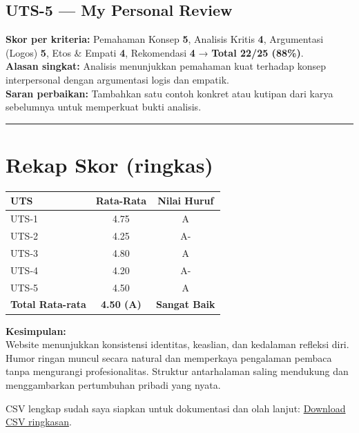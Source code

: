 \documentclass[
  letterpaper,
  DIV=11,
  numbers=noendperiod]{scrreprt}
\begin{document}
\subsection{\texorpdfstring{\textbf{UTS-5 --- My Personal
Review}}{UTS-5 --- My Personal Review}}\label{uts-5-my-personal-review}

\textbf{Skor per kriteria:} Pemahaman Konsep \textbf{5}, Analisis Kritis
\textbf{4}, Argumentasi (Logos) \textbf{5}, Etos \& Empati \textbf{4},
Rekomendasi \textbf{4} → \textbf{Total 22/25 (88\%)}.\\
\textbf{Alasan singkat:} Analisis menunjukkan pemahaman kuat terhadap
konsep interpersonal dengan argumentasi logis dan empatik.\\
\textbf{Saran perbaikan:} Tambahkan satu contoh konkret atau kutipan
dari karya sebelumnya untuk memperkuat bukti analisis.

\begin{center}\rule{0.5\linewidth}{0.5pt}\end{center}

\section{Rekap Skor (ringkas)}\label{rekap-skor-ringkas}

\begin{longtable}[]{@{}lcc@{}}
\toprule\noalign{}
UTS & Rata-Rata & Nilai Huruf \\
\midrule\noalign{}
\endhead
\bottomrule\noalign{}
\endlastfoot
UTS-1 & 4.75 & A \\
UTS-2 & 4.25 & A- \\
UTS-3 & 4.80 & A \\
UTS-4 & 4.20 & A- \\
UTS-5 & 4.50 & A \\
\textbf{Total Rata-rata} & \textbf{4.50 (A)} & \textbf{Sangat Baik} \\
\end{longtable}

\textbf{Kesimpulan:}\\
Website menunjukkan konsistensi identitas, keaslian, dan kedalaman
refleksi diri. Humor ringan muncul secara natural dan memperkaya
pengalaman pembaca tanpa mengurangi profesionalitas. Struktur
antarhalaman saling mendukung dan menggambarkan pertumbuhan pribadi yang
nyata.

CSV lengkap sudah saya siapkan untuk dokumentasi dan olah lanjut:
\href{sandbox:/mnt/data/UTS_self_assessment.csv}{Download CSV
ringkasan}.
\end{document}
